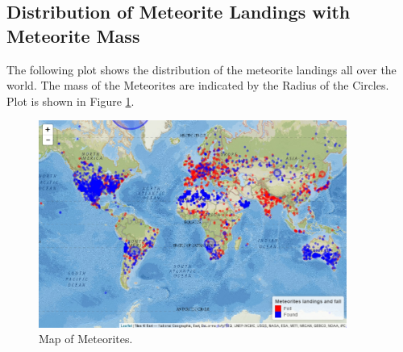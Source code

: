 \subsection{Distribution of Meteorite Landings with Meteorite Mass}
The following plot shows the distribution of the meteorite landings all over the world. The mass of the Meteorites are indicated by the Radius of the Circles. Plot is shown in Figure \ref{fig:fig14}.
\begin{figure}
	\centering
	\includegraphics[width=0.9\textwidth]{Figures/14MapOfMeteorites.jpeg}
	\caption{\label{fig:fig14} Map of Meteorites.}
\end{figure}

